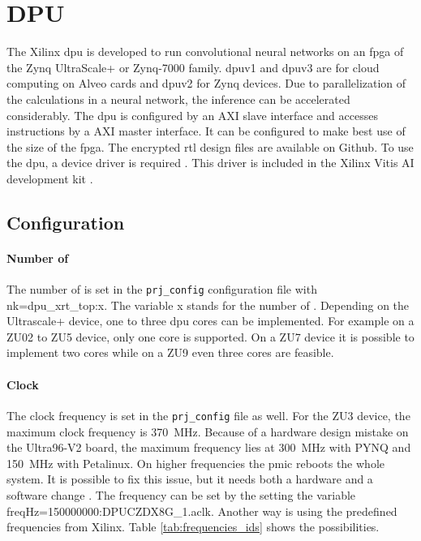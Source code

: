 \section{DPU}
\label{sec:embedded_platform:dpu}

The Xilinx \acrfull{dpu} is developed to run convolutional neural networks on an \acrshort{fpga} of the Zynq UltraScale+ or Zynq-7000 family.
\acrshort{dpu}v1 and \acrshort{dpu}v3 are for cloud computing on Alveo cards and \acrshort{dpu}v2 for Zynq devices. 
Due to parallelization of the calculations in a neural network, the inference can be accelerated considerably.
The \acrshort{dpu} is configured by an AXI slave interface and accesses instructions by a AXI master interface.
It can be configured to make best use of the size of the \acrshort{fpga}.
The encrypted \acrshort{rtl} design files are available on Github.
To use the \acrshort{dpu}, a device driver is required \cite{dpu_product_guide}.
This driver is included in the Xilinx Vitis AI development kit \cite{dpu_product_guide_v3_2}.

\subsection{Configuration}
\label{subsec:embedded_platform:dpu:configuration}
\paragraph{Number of }
The number of  is set in the \texttt{prj\_config} configuration file with nk=dpu\_xrt\_top:x.
The variable x stands for the number of .
Depending on the Ultrascale+ device, one to three \acrshort{dpu} cores can be implemented.
For example on a ZU02 to ZU5 device, only one core is supported.
On a ZU7 device it is possible to implement two cores while on a ZU9 even three cores are feasible.

\paragraph{Clock}
The clock frequency is set in the \texttt{prj\_config} file as well.
For the ZU3 device, the maximum clock frequency is \SI{370}{MHz}.
Because of a hardware design mistake on the Ultra96-V2 board, the maximum frequency lies at \SI{300}{MHz} with PYNQ and \SI{150}{MHz} with Petalinux.
On higher frequencies the \acrfull{pmic} reboots the whole system.
It is possible to fix this issue, but it needs both a hardware and a software change \cite{pmic_issue}.
The frequency can be set  by the setting the variable  freqHz=150000000:DPUCZDX8G\_1.aclk.
Another way is using the predefined frequencies from Xilinx.
Table \ref{tab:frequencies_ids} shows the possibilities.

